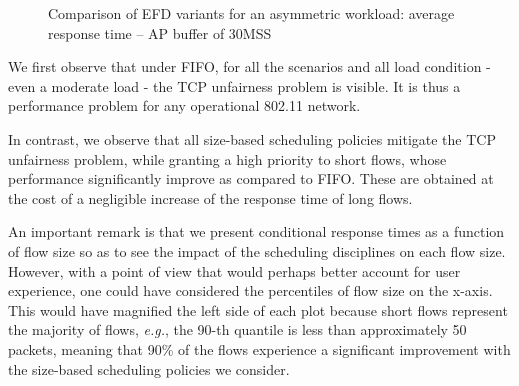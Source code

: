 \documentclass[preprint,12pt]{elsarticle}
\begin{document}
\begin{figure}[ht!]
  \centering
  \caption{Comparison of EFD variants for an asymmetric workload: average response time --  AP buffer of 30MSS}
  \label{fig:avg_time_asym}
\end{figure}

We first observe that under FIFO, for all the scenarios and all load condition - even a moderate load - the TCP unfairness problem is visible. It is thus a performance problem for any operational 802.11 network.

In contrast, we observe that all size-based scheduling policies mitigate the TCP unfairness problem, while granting a high priority to short flows, whose performance significantly improve as compared to FIFO. These are obtained at the cost of a negligible increase of the response time of long flows. 

An important remark is that we  present conditional response times as a function of flow size so as to see the impact of the scheduling disciplines on each flow size. However, with a point of view that would perhaps better account for user experience, one could have considered the percentiles of flow size on the x-axis. This would have magnified the left side of each plot because short flows represent the majority of flows, \textit{e.g.}, the 90-th quantile is less than approximately 50 packets, meaning that 90\% of the flows experience a significant improvement with the size-based scheduling policies we consider.
\end{document}
